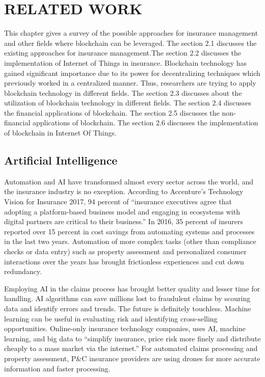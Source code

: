 \chapter{RELATED WORK} %
This chapter gives a survey of the possible approaches for insurance management and other fields where blockchain can be leveraged. The section 2.1 discusses the existing approaches for insurance management.The section 2.2 discusses the implementation of Internet of Things in  insurance.  Blockchain technology has
gained significant importance due to its power for decentralizing techniques which previously worked in a centralized manner. Thus, researchers are trying to apply blockchain technology in different fields. The section 2.3 discusses about the utilization of blockchain technology in different fields. The section 2.4 discusses the financial applications of blockchain. The section 2.5 discusses the non-financial applications of blockchain. The section 2.6 discusses the implementation of blockchain in Internet Of Things.

\section{Artificial Intelligence}
\lipsum[]
Automation and AI have transformed almost every sector across the world, and the insurance industry is no exception. According to Accenture’s Technology Vision for Insurance 2017, 94 percent of “insurance executives agree that adopting a platform-based business model and engaging in ecosystems with digital partners are critical to their business.” In 2016, 35 percent of insurers reported over 15 percent in cost savings from automating systems and processes in the last two years. Automation of more complex tasks (other than compliance checks or data entry) such as property assessment and personalized consumer interactions over the years has brought frictionless experiences and cut down redundancy. 

Employing AI in the claims process has brought better quality and lesser time for handling. AI algorithms can save millions lost to fraudulent claims by scouring data and identify errors and trends. The future is definitely touchless. Machine learning can be useful in evaluating risk and identifying cross-selling opportunities. Online-only insurance technology companies, uses AI, machine learning, and big data to “simplify insurance, price risk more finely and distribute cheaply to a mass market via the internet.” For automated claims processing and property assessment, P&C insurance providers are using drones for more accurate information and faster processing.
